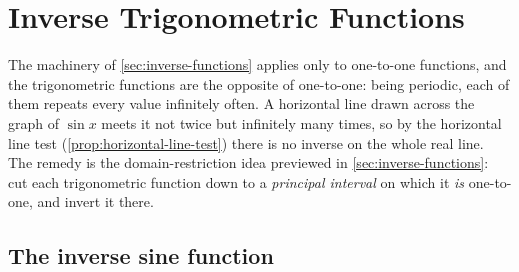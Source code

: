 
\section{Inverse Trigonometric Functions}\label{sec:inverse-trig-functions}

The machinery of \cref{sec:inverse-functions} applies only to one-to-one functions, and the trigonometric functions are the opposite of one-to-one: being periodic, each of them repeats every value infinitely often. A horizontal line drawn across the graph of \(\sin x\) meets it not twice but infinitely many times, so by the horizontal line test (\cref{prop:horizontal-line-test}) there is no inverse on the whole real line. The remedy is the domain-restriction idea previewed in \cref{sec:inverse-functions}: cut each trigonometric function down to a \emph{principal interval} on which it \emph{is} one-to-one, and invert it there.

\subsection{The inverse sine function}

